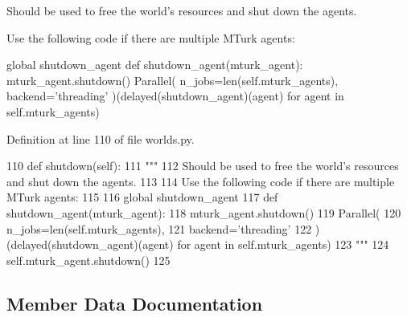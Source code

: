 \begin{DoxyVerb}Should be used to free the world's resources and shut down the agents.

Use the following code if there are multiple MTurk agents:

global shutdown_agent
def shutdown_agent(mturk_agent):
    mturk_agent.shutdown()
Parallel(
    n_jobs=len(self.mturk_agents),
    backend='threading'
)(delayed(shutdown_agent)(agent) for agent in self.mturk_agents)
\end{DoxyVerb}
 

Definition at line 110 of file worlds.\+py.


\begin{DoxyCode}
110     \textcolor{keyword}{def }shutdown(self):
111         \textcolor{stringliteral}{"""}
112 \textcolor{stringliteral}{        Should be used to free the world's resources and shut down the agents.}
113 \textcolor{stringliteral}{}
114 \textcolor{stringliteral}{        Use the following code if there are multiple MTurk agents:}
115 \textcolor{stringliteral}{}
116 \textcolor{stringliteral}{        global shutdown\_agent}
117 \textcolor{stringliteral}{        def shutdown\_agent(mturk\_agent):}
118 \textcolor{stringliteral}{            mturk\_agent.shutdown()}
119 \textcolor{stringliteral}{        Parallel(}
120 \textcolor{stringliteral}{            n\_jobs=len(self.mturk\_agents),}
121 \textcolor{stringliteral}{            backend='threading'}
122 \textcolor{stringliteral}{        )(delayed(shutdown\_agent)(agent) for agent in self.mturk\_agents)}
123 \textcolor{stringliteral}{        """}
124         self.mturk\_agent.shutdown()
125 
\end{DoxyCode}


\subsection{Member Data Documentation}
\mbox{\label{classparlai_1_1mturk_1_1core_1_1legacy__2018_1_1worlds_1_1MTurkTaskWorld_aa17f5e23d82dcbc26ac52ff116a370d5}} 
